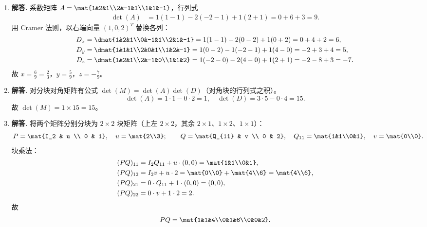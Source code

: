 \begin{enumerate}[label=\textbf{\arabic*.}, leftmargin=*, itemsep=1em]
  \item \textbf{解答.}
  系数矩阵 $A=\mat{1&2&1\\2&-1&1\\1&1&-1}$，行列式
  \begin{align*}
    \det(A)
    &=1(1-1)-2(-2-1)+1(2+1)=0+6+3=9.
  \end{align*}
  用 Cramer 法则，以右端向量 $(1,0,2)^T$ 替换各列：
  \begin{align*}
    D_x &= \dmat{1&2&1\\0&-1&1\\2&1&-1}
         = 1(1-1)-2(0-2)+1(0+2)=0+4+2=6,\\
    D_y &= \dmat{1&1&1\\2&0&1\\1&2&-1}
         = 1(0-2)-1(-2-1)+1(4-0)=-2+3+4=5,\\
    D_z &= \dmat{1&2&1\\2&-1&0\\1&1&2}
         = 1(-2-0)-2(4-0)+1(2+1)=-2-8+3=-7.
  \end{align*}
  故 $x=\tfrac{6}{9}=\tfrac{2}{3}$，$y=\tfrac{5}{9}$，$z=-\tfrac{7}{9}$。

  \item \textbf{解答.}
  对分块对角矩阵有公式 $\det(M)=\det(A)\det(D)$（对角块的行列式之积）。
  \[
    \det(A)=1\cdot1-0\cdot2=1,\quad \det(D)=3\cdot5-0\cdot4=15.
  \]
  故 $\det(M)=1\times15=15$。

  \item \textbf{解答.}
  将两个矩阵分别分块为 $2\times2$ 块矩阵（上左 $2\times2$，其余 $2\times1$、$1\times2$、$1\times1$）：
  \[
    P=\mat{I_2 & u \\ 0 & 1},\quad u=\mat{2\\3};\qquad
    Q=\mat{Q_{11} & v \\ 0 & 2},\quad Q_{11}=\mat{1&1\\0&1},\quad v=\mat{0\\0}.
  \]
  块乘法：
  \begin{align*}
    (PQ)_{11} &= I_2 Q_{11} + u\cdot(0,0) = \mat{1&1\\0&1},\\
    (PQ)_{12} &= I_2 v + u\cdot2 = \mat{0\\0}+\mat{4\\6}=\mat{4\\6},\\
    (PQ)_{21} &= 0\cdot Q_{11}+1\cdot(0,0)=(0,0),\\
    (PQ)_{22} &= 0\cdot v+1\cdot2=2.
  \end{align*}
  故
  \[
    PQ = \mat{1&1&4\\0&1&6\\0&0&2}.
  \]


\end{enumerate}
